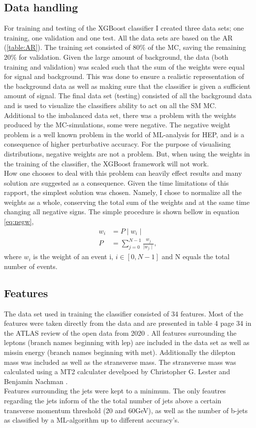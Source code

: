 \documentclass{article}
\begin{document}
\subsection{Data handling}\label{sec:DH}
For training and testing of the XGBoost classifier I created three data sets; one training, one validation and one test. All the data sets are based on the AR (\ref{table:AR}). The training set consisted of $80\%$ of the MC, saving the remaining $20\%$ for validation. Given the large amount of background, the data (both training and validation) was scaled such that the sum of the weights were equal for signal and background. This was done to ensure a realistic representation of the background data as well as making sure that the classifier is given a sufficient amount of signal. The final data set (testing) consisted of all the background data and is used to visualize the classifiers ability to act on all the SM MC.
\\
Additional to the imbalanced data set, there was a problem with the weights produced by the MC-simulations, some were negative. The negative weight problem is a well known problem in the world of ML-analysis for HEP, and is a consequence of higher perturbative accuracy. For the purpose of visualising distributions, negative weights are not a problem. But, when using the weights in the training of the classifier, the XGBoost framework will not work. 
\\
How one chooses to deal with this problem can heavily effect results and many solution are suggested as a consequence. Given the time limitations of this rapport, the simplest solution was chosen. Namely, I chose to normalize all the weights as a whole, conserving the total sum of the weights and at the same time changing all negative signs. The simple procedure is shown bellow in equation \ref{eq:negw},
\begin{align}\label{eq:negw}
    w_i & = P \mid w_i \mid\,  \\
    P  & =  \sum_{j=0}^{N-1}\frac{ w_j}{\mid w_j \mid},
\end{align}
where $w_i$ is the weight of an event i, $i \in [0,N-1]$ and N equals the total number of events.
\subsection{Features}
The data set used in training the classifier consisted of 34 features. Most of the features were taken directly from the data and are presented in table 4 page 34 in the ATLAS review of the open data from 2020 \cite{ATL-OREACH-PUB-2020-001}. All features surrounding the leptons (branch names beginning with lep) are included in the data set as well as missin energy (branch names beginning with met). Additionally the dilepton mass was included as well as the stransverse mass. The stransverse mass was calculated using a MT2 calculater develpoed by Christopher G. Lester and Benjamin Nachman \cite{Lester_2015}.
\\
Features surrounding the jets were kept to a minimum. The only feautres regarding the jets inform of the the total number of jets above a certain transverse momentum threshold (20 and 60GeV), as well as the number of b-jets as classified by a ML-algorithm up to different accuracy's.
\end{document}

